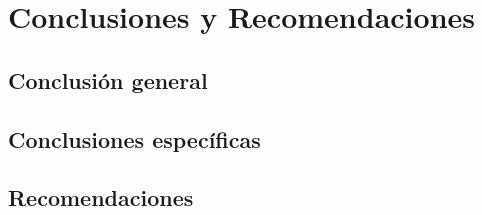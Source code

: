 
\doublespacing

\chapter{Conclusiones y Recomendaciones}

\section{Conclusión general}
\section{Conclusiones específicas}
\section{Recomendaciones}